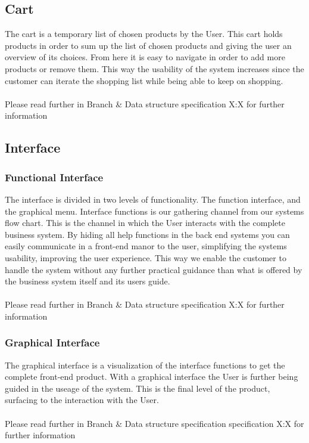 \documentclass[11pt]{article}
\begin{document}
\subsection{Cart}
The cart is a temporary list of chosen products by the User.  This cart holds products in order to sum up the list of chosen products and giving the user an overview of its choices. From here it is easy to navigate in order to add more products or remove them. This way the usability of the system increases since the customer can iterate the shopping list while being able to keep on shopping.\\\\
Please read further in Branch \& Data structure specification X:X for further information\\
\subsection{Interface}
\subsubsection{Functional Interface}
The interface is divided in two levels of functionality. The function interface, and the graphical menu.
Interface functions is our gathering channel from our systems flow chart. This is the channel in which the User interacts with the complete business system. By hiding all help functions in the back end systems you can easily communicate in a front-end manor to the user, simplifying the systems usability, improving the user experience. This way we enable the customer to handle the system without any further practical guidance than what is offered by the business system itself and its users guide.
\\\\
Please read further in Branch \& Data structure specification X:X for further information
\subsubsection{Graphical Interface}
The graphical interface is a visualization of the interface functions to get the complete front-end product. With a graphical interface the User is further being guided in the useage of the system. This is the final level of the product, surfacing to the interaction with the User.
\\\\
Please read further in Branch \& Data structure specification specification X:X for further information
\end{document}
